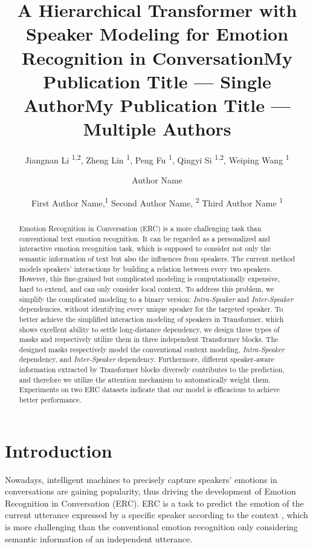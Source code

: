 \documentclass[letterpaper]{article} \usepackage{aaai21}  \usepackage{times}  \usepackage{helvet} \usepackage{courier}  \usepackage[hyphens]{url}  \usepackage{graphicx} \urlstyle{rm} \def\UrlFont{\rm}  \usepackage{natbib}  \usepackage{caption} \usepackage{multirow}
\title{A Hierarchical Transformer with Speaker Modeling for Emotion Recognition in Conversation}
\author{
    Jiangnan Li \textsuperscript{\rm 1,2}, 
    Zheng Lin \textsuperscript{\rm 1}, 
    Peng Fu \textsuperscript{\rm 1}, 
    Qingyi Si \textsuperscript{\rm 1,2}, 
    Weiping Wang \textsuperscript{\rm 1}
    \\
}
\title{My Publication Title --- Single Author}
\author {
Author Name \\
}
\title{My Publication Title --- Multiple Authors}
\author {


        First Author Name,\textsuperscript{\rm 1}
        Second Author Name, \textsuperscript{\rm 2}
        Third Author Name \textsuperscript{\rm 1} \\
}
\begin{document}
\maketitle

\begin{abstract}
Emotion Recognition in Conversation (ERC) is a more challenging task than conventional text emotion recognition. It can be regarded as a personalized and interactive emotion recognition task, which is supposed to consider not only the semantic information of text but also the influences from speakers. The current method models speakers’ interactions by building a relation between every two speakers. However, this fine-grained but complicated modeling is computationally expensive, hard to extend, and can only consider local context. To address this problem, we simplify the complicated modeling to a binary version: \emph{Intra-Speaker} and \emph{Inter-Speaker} dependencies, without identifying every unique speaker for the targeted speaker. To better achieve the simplified interaction modeling of speakers in Transformer, which shows excellent ability to settle long-distance dependency, we design three types of masks and respectively utilize them in three independent Transformer blocks. The designed masks respectively model the conventional context modeling, \emph{Intra-Speaker} dependency, and \emph{Inter-Speaker} dependency. Furthermore, different speaker-aware information extracted by Transformer blocks diversely contributes to the prediction, and therefore we utilize the attention mechanism to automatically weight them. Experiments on two ERC datasets indicate that our model is efficacious to achieve better performance.

\end{abstract}

\section{Introduction}



Nowadays, intelligent machines to precisely capture speakers' emotions in conversations are gaining popularity, thus driving the development of Emotion Recognition in Conversation (ERC). ERC is a task to predict the emotion of the current utterance expressed by a specific speaker according to the context \citep{Survey}, which is more challenging than the conventional emotion recognition only considering semantic information of an independent utterance. 
\end{document}
